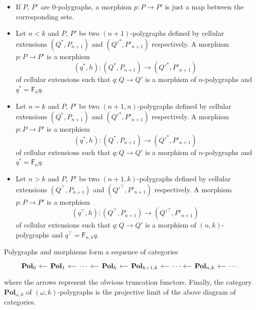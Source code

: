 \documentclass[reqno]{amsart}
\theoremstyle{plain}
\theoremstyle{definition}
\theoremstyle{remark}
\newcommand{\pair}[2]{(#1,#2)}       %
\newcommand{\ctg}[1]{\mathbf{#1}}  %
\newcommand{\Pol}{\ctg{Pol}}
\newcommand{\nPol}[1]{\Pol_{#1}} %
\newcommand{\npPol}[2]{\Pol_{#1,#2}} %
\newcommand{\opPol}[1]{\npPol{\omega}{#1}} %
\newcommand{\functor}[1]{\mathsf{#1}} %
\newcommand{\frf}[1]{\functor{F}_{#1}} %
\newcommand{\frcat}[1]{#1^*} %
\newcommand{\frgp}[1]{#1^\top} %
\newcommand{\ook}[1]{\ensuremath{\pair{\omega}{#1}}}
\newcommand{\clx}[2]{\pair{#1}{#2}}%
\begin{document}
\begin{itemize}
\item If $P$, $P'$ are $0$-polygraphs, a morphism $p:P\to P'$ is
  just a map between the corresponding sets.
\item Let $n< k$ and $P$, $P'$ be two $(n{+}1)$-polygraphs defined by
  cellular extensions $\clx{\frcat Q\!}{P_{n+1}}$ and  $\clx{\frcat{Q'}\!}{P'_{n+1}}$ respectively. A morphism $p:P\to P'$ is a
  morphism
  \[\clx{\frcat q}{h}:\clx{\frcat Q\!}{P_{n+1}}\to \clx{\frcat
      {Q'}\!}{P'_{n+1}}\]
  of cellular extensions such that $q:Q\to Q'$ is a morphism of
  $n$-polygraphs and $\frcat q=\frf n q$.
\item Let $n= k$ and $P$, $P'$ be two $\pair{n{+}1}n$-polygraphs defined by
  cellular extensions $\clx{\frcat Q\!}{P_{n+1}}$ and  $\clx{\frcat
    {Q'}\!}{P'_{n+1}}$ respectively. A morphism $p:P\to P'$ is a
  morphism
  \[\clx{\frcat q}{h}:\clx{\frcat Q\!}{P_{n+1}}\to \clx{\frcat
      {Q'}\!}{P'_{n+1}}\]
  of cellular extensions such that $q:Q\to Q'$ is a morphism of
  $n$-polygraphs and $\frcat q=\frf n q$.  
  \item Let $n> k$ and $P$, $P'$ be two $\pair{n{+}1}k$-polygraphs defined by
  cellular extensions $\clx{\frgp Q\!}{P_{n+1}}$ and  $\clx{\frgp
    {Q'}\!}{P'_{n+1}}$ respectively. A morphism $p:P\to P'$ is a
  morphism
  \[\clx{\frgp q}{h}:\clx{\frgp Q\!}{P_{n+1}}\to \clx{\frgp
      {Q'}\!}{P'_{n+1}}\]
  of cellular extensions such that $q:Q\to Q'$ is a morphism of
  $\pair nk$-polygraphs and $\frgp q=\frf{n,k} q$.
\end{itemize}
Polygraphs and morphisms form a  sequence of categories
  \[
    \begin{tikzcd}[column sep=small]
    \nPol 0 &\nPol 1\ar[l]& \cdots\ar[l] & \nPol k\ar[l] & \npPol{k+1}k \ar[l]& \cdots\ar[l] &
    \npPol nk\ar[l] & \cdots\ar[l]  
    \end{tikzcd}
    \]
  where the arrows represent the obvious truncation functors. Finally,
  the category $\opPol k$ of \ook k-polygraphs is the projective limit of the
  above diagram of categories.
\end{document}
